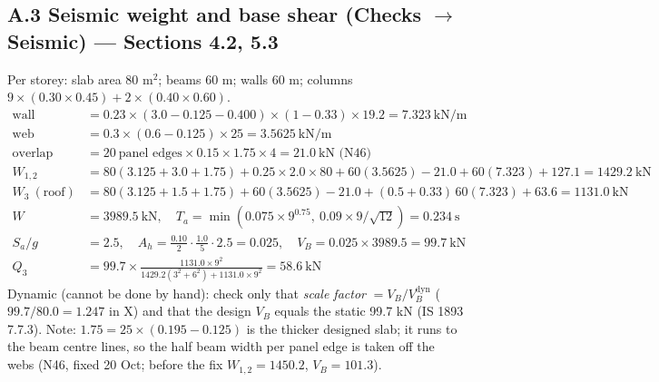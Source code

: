 \documentclass[10pt,a4paper]{article}
\begin{document}
\subsection*{A.3 Seismic weight and base shear (Checks $\rightarrow$ Seismic) --- Sections 4.2, 5.3}
Per storey: slab area 80 m$^2$; beams 60 m; walls 60 m; columns $9\times(0.30\times0.45)+2\times(0.40\times0.60)$.
\begin{align*}
\text{wall}&=0.23\times(3.0-0.125-0.400)\times(1-0.33)\times19.2=7.323\ \text{kN/m}\\
\text{web}&=0.3\times(0.6-0.125)\times25=3.5625\ \text{kN/m}\\
\text{overlap}&=20\ \text{panel edges}\times0.15\times1.75\times4=21.0\ \text{kN (N46)}\\
W_{1,2}&=80(3.125+3.0+1.75)+0.25\times2.0\times80+60(3.5625)-21.0+60(7.323)+127.1=\mathbf{1429.2}\ \text{kN}\\
W_3\ (\text{roof})&=80(3.125+1.5+1.75)+60(3.5625)-21.0+(0.5+0.33)\,60(7.323)+63.6=\mathbf{1131.0}\ \text{kN}\\
W&=\mathbf{3989.5}\ \text{kN},\quad T_a=\min(0.075\times9^{0.75},\ 0.09\times9/\sqrt{12})=\mathbf{0.234}\ \text{s}\\
S_a/g&=2.5,\quad A_h=\tfrac{0.10}{2}\cdot\tfrac{1.0}{5}\cdot2.5=0.025,\quad V_B=0.025\times3989.5=\mathbf{99.7}\ \text{kN}\\
Q_3&=99.7\times\frac{1131.0\times9^2}{1429.2(3^2+6^2)+1131.0\times9^2}=\mathbf{58.6}\ \text{kN}
\end{align*}
Dynamic (cannot be done by hand): check only that \emph{scale factor} $=V_B/V_B^\text{dyn}$
($99.7/80.0=1.247$ in X) and that the design $V_B$ equals the static 99.7 kN (IS 1893 7.7.3).
Note: $1.75 = 25\times(0.195-0.125)$ is the thicker designed slab; it runs to the beam centre lines, so the half
beam width per panel edge is taken off the webs (N46, fixed 20 Oct; before the fix $W_{1,2}=1450.2$, $V_B=101.3$).
\end{document}
